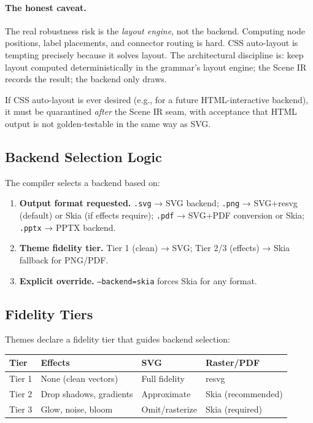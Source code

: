 \paragraph{The honest caveat.}
The real robustness risk is the \emph{layout engine}, not the backend. Computing node positions, label placements, and connector routing is hard. CSS auto-layout is tempting precisely because it solves layout. The architectural discipline is: keep layout computed deterministically in the grammar's layout engine; the Scene IR records the result; the backend only draws.

If CSS auto-layout is ever desired (e.g., for a future HTML-interactive backend), it must be quarantined \emph{after} the Scene IR seam, with acceptance that HTML output is not golden-testable in the same way as SVG.

\subsection{Backend Selection Logic}

The compiler selects a backend based on:

\begin{enumerate}
  \item \textbf{Output format requested.} \texttt{.svg} → SVG backend; \texttt{.png} → SVG+resvg (default) or Skia (if effects require); \texttt{.pdf} → SVG+PDF conversion or Skia; \texttt{.pptx} → PPTX backend.
  
  \item \textbf{Theme fidelity tier.} Tier 1 (clean) → SVG; Tier 2/3 (effects) → Skia fallback for PNG/PDF.
  
  \item \textbf{Explicit override.} \texttt{--backend=skia} forces Skia for any format.
\end{enumerate}

\subsection{Fidelity Tiers}
\label{sec:fidelity-tiers}

Themes declare a fidelity tier that guides backend selection:

\begin{center}
\small
\begin{tabular}{llll}
\toprule
\textbf{Tier} & \textbf{Effects} & \textbf{SVG} & \textbf{Raster/PDF} \\
\midrule
Tier 1 & None (clean vectors) & Full fidelity & resvg \\
Tier 2 & Drop shadows, gradients & Approximate & Skia (recommended) \\
Tier 3 & Glow, noise, bloom & Omit/rasterize & Skia (required) \\
\bottomrule
\end{tabular}
\end{center}

